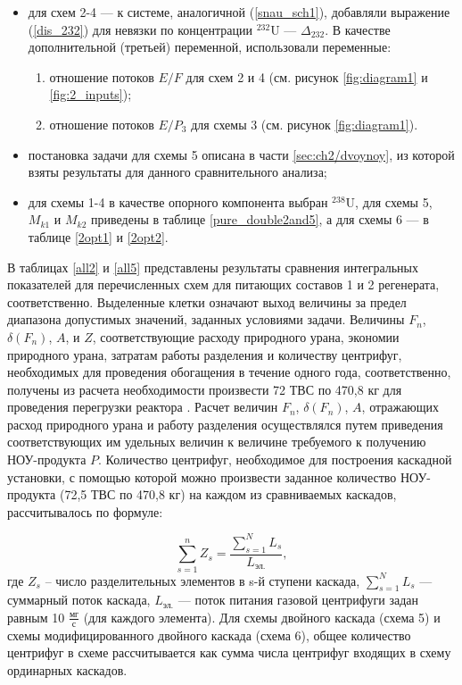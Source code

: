 \begin{itemize}
    \item для схем 2-4 --- к системе, аналогичной (\ref{snau_sch1}), добавляли выражение (\ref{dis_232}) для невязки по концентрации $^{232}$U --- $\Delta_{232}$. В качестве дополнительной (третьей) переменной, использовали переменные:
    \begin{enumerate}
        \item отношение потоков $E/{F}$ для схем 2 и 4 (см. рисунок \ref{fig:diagram1} и \ref{fig:2_inputs});
        \item отношение потоков $E/{P_3}$ для схемы 3 (см. рисунок \ref{fig:diagram1}).
    \end{enumerate}
    \item постановка задачи для схемы 5 описана в части \ref{sec:ch2/dvoynoy}, из которой взяты результаты для данного сравнительного анализа;
    \item для схемы 1-4 в качестве опорного компонента выбран $^{238}$U, для схемы 5, $M_{k1}$ и $M_{k2}$ приведены в таблице \ref{pure_double2and5}, а для схемы 6 --- в таблице \ref{2opt1} и \ref{2opt2}.
\end{itemize}

В таблицах \ref{all2} и \ref{all5} представлены результаты сравнения интегральных показателей для перечисленных схем для питающих составов 1 и 2 регенерата, соответственно. Выделенные клетки означают выход величины за предел диапазона допустимых значений, заданных условиями задачи. 
Величины $F_n$, $\delta(F_n)$, $A$, и $Z$, соответствующие расходу природного урана, экономии природного урана, затратам работы разделения и количеству центрифуг, необходимых для проведения обогащения в течение одного года, соответственно, получены из расчета необходимости произвести 72 ТВС по 470,8 кг для проведения перегрузки реактора \cite{BOBROVPovyshenieTehnikoekonomicheskihHarakteristik2019}. Расчет величин $F_n$, $\delta(F_n)$, $A$, отражающих расход природного урана и работу разделения осуществлялся путем приведения соответствующих им удельных величин к величине требуемого к получению НОУ-продукта $P$. Количество центрифуг, необходимое для построения каскадной установки, с помощью которой можно произвести заданное количество НОУ-продукта (72,5 ТВС по 470,8 кг) на каждом из сравниваемых каскадов, рассчитывалось по формуле:

\begin{equation}\label{z_cas}
    \sum_{s=1}^n Z_s=\frac{\sum_{s=1}^N L_s}{L_{\textit{эл.}}},
\end{equation}
где $Z_s$ – число разделительных элементов в s-й ступени каскада, $\sum_{s=1}^N L_s$ --- суммарный поток каскада, $L_{\textit{эл.}}$ --- поток питания газовой центрифуги задан равным 10 $\frac{\textit{мг}}{\textit{с}}$ (для каждого элемента). Для схемы двойного каскада (схема 5) и схемы модифицированного двойного каскада (схема 6), общее количество центрифуг в схеме рассчитывается как сумма числа центрифуг входящих в схему ординарных каскадов.

